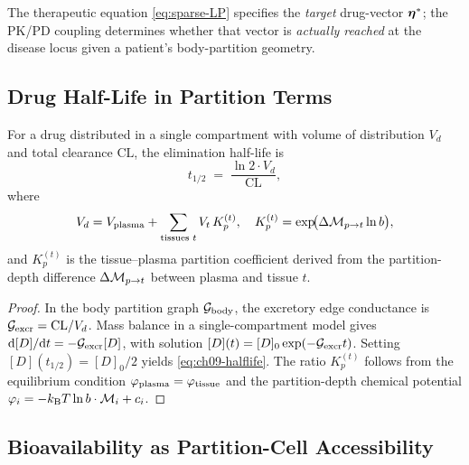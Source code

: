 The therapeutic equation \eqref{eq:sparse-LP} specifies the \emph{target}
drug-vector $\boldsymbol{\eta}^*$; the PK/PD coupling determines whether that vector is
\emph{actually reached} at the disease locus given a patient's body-partition
geometry.

\subsection{Drug Half-Life in Partition Terms}
\label{subsec:ch09-halflife}

\begin{proposition}
\label{prop:ch09-halflife}
For a drug distributed in a single compartment with volume of distribution
$V_d$ and total clearance $\mathrm{CL}$, the elimination half-life is
\begin{equation}
  t_{1/2} \;=\; \frac{\ln 2\cdot V_d}{\mathrm{CL}},
  \label{eq:ch09-halflife}
\end{equation}
where
\begin{equation}
  V_d = V_{\mathrm{plasma}} + \sum_{\text{tissues } t} V_t\,K_p^{(t)},
  \quad
  K_p^{(t)} = \exp\!\bigl(\Delta\mathcal{M}_{p\to t}\ln b\bigr),
  \label{eq:ch09-Vd}
\end{equation}
and $K_p^{(t)}$ is the tissue--plasma partition coefficient derived from the
partition-depth difference $\Delta\mathcal{M}_{p\to t}$ between plasma and tissue $t$.
\end{proposition}

\begin{proof}
In the body partition graph $\mathcal{G}_{\mathrm{body}}$, the excretory edge
conductance is $\mathcal{G}_{\mathrm{excr}} = \mathrm{CL}/V_d$.  Mass balance in a
single-compartment model gives $\mathrm{d}[D]/\mathrm{d}t =
-\mathcal{G}_{\mathrm{excr}}[D]$, with solution $[D](t) = [D]_0
\exp(-\mathcal{G}_{\mathrm{excr}} t)$.  Setting $[D](t_{1/2}) = [D]_0/2$ yields
\eqref{eq:ch09-halflife}.  The ratio $K_p^{(t)}$ follows from the equilibrium
condition $\varphi_{\mathrm{plasma}} = \varphi_{\mathrm{tissue}}$
and the partition-depth chemical potential
$\varphi_i = -k_{\mathrm{B}} T\ln b\cdot\mathcal{M}_i + c_i$.
\end{proof}

\subsection{Bioavailability as Partition-Cell Accessibility}
\label{subsec:ch09-bioavail}

